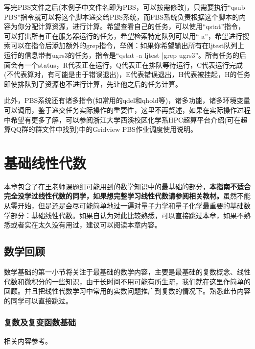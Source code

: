 \documentclass[12pt,a4paper,openany,twoside]{book}
\numberwithin{equation}{section}
\begin{document}
        写完PBS文件之后(本例子中文件名即为PBS，可以按需修改)，只需要执行“qsub PBS”指令就可以将这个脚本递交给PBS系统，而PBS系统负责根据这个脚本的内容为你分配计算资源，进行计算。希望查看自己的任务，可以使用“qstat”指令，可以打出所有正在服务器运行的任务，希望检索特定队列可以用“-a”，希望进行搜索可以在指令后添加额外的grep指令，举例：如果你希望输出所有在ljtest队列上运行的信息带有ugrs3的任务，指令是“qstat -a ljtest |grep ugrs3”。所有任务的后面会有一个status，R代表正在运行，Q代表正在排队等待运行，C代表运行完成(不代表算对，有可能是由于错误退出)，E代表错误退出，H代表被挂起，H的任务即使排队到了资源也不进行计算，先让他之后的任务计算。

        此外，PBS系统还有诸多指令(如常用的qdel和qhold等)，诸多功能，诸多环境变量可以调用，鉴于递交任务实际操作的重要性，这里不再赘述，如果在实际操作过程中希望有更多了解，可以参阅浙江大学西溪校区化学系HPC超算平台介绍(可在超算QQ群的群文件中找到)中的Gridview PBS作业调度使用说明。
      
    \chapter{基础线性代数}

      本章包含了在王老师课题组可能用到的数学知识中的最基础的部分，\textbf{本指南不适合完全没学过线性代数的同学，如果想完整学习线性代数请参阅相关教材。}虽然不能从零开始，但是还是会尽可能简单地过一遍对量子力学和量子化学最重要的基础数学部分：基础线性代数。如果自认为对此比较熟悉，可以直接跳过本章，如果不熟悉或者实在太久没有用过，建议可以阅读本章内容。

      \section{数学回顾}
      
        数学基础的第一小节将关注于最基础的数学内容，主要是最基础的复数概念、线性代数和微积分的一些知识，由于长时间不用可能有所生疏，我们就在这里作简单的回顾。并且把线性代数学习中常用的实数问题推广到复数的情况下。熟悉此节内容的同学可以直接跳过。

        \subsection{复数及复变函数基础}

          相关内容参考\cite{methods_in_math_phys_liang}。

          {}
          
\end{document}
